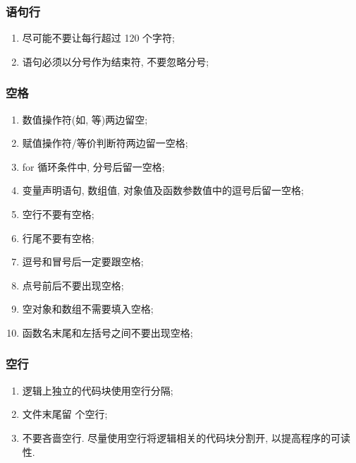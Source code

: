 \documentclass[letterpaper,10pt,english]{sphinxmanual}
\begin{document}
\subsubsection{语句行}
\label{styleguide/js-style-rules:id2}\begin{enumerate}
\item {}
尽可能不要让每行超过 120 个字符;

\item {}
语句必须以分号作为结束符, 不要忽略分号;

\end{enumerate}


\subsubsection{空格}
\label{styleguide/js-style-rules:id3}\begin{enumerate}
\item {}
数值操作符(如, \code{+/-/*/\%} 等)两边留空;

\item {}
赋值操作符/等价判断符两边留一空格;

\item {}
for 循环条件中, 分号后留一空格;

\item {}
变量声明语句, 数组值, 对象值及函数参数值中的逗号后留一空格;

\item {}
空行不要有空格;

\item {}
行尾不要有空格;

\item {}
逗号和冒号后一定要跟空格;

\item {}
点号前后不要出现空格;

\item {}
空对象和数组不需要填入空格;

\item {}
函数名末尾和左括号之间不要出现空格;

\end{enumerate}


\subsubsection{空行}
\label{styleguide/js-style-rules:id4}\begin{enumerate}
\item {}
逻辑上独立的代码块使用空行分隔;

\item {}
文件末尾留  个空行;

\item {}
不要吝啬空行. 尽量使用空行将逻辑相关的代码块分割开, 以提高程序的可读性.

\end{enumerate}
\end{document}
